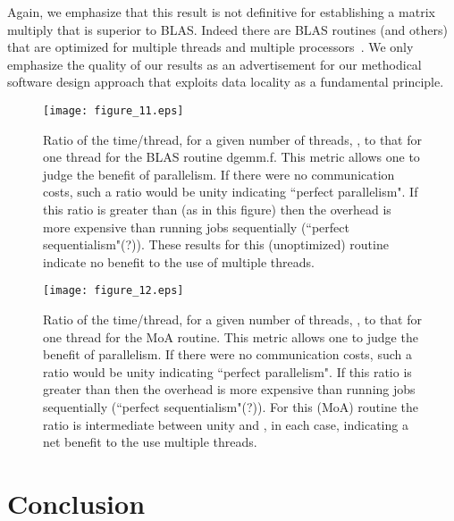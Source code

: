 \documentclass[aps,prl,twocolumn,groupedaddress,floatfix]{revtex4}
\begin{document}
Again, we emphasize that this result is not definitive for establishing
a matrix multiply that is superior to BLAS.  Indeed there are BLAS routines
(and others) that are optimized for multiple threads and multiple 
processors~\cite{addison,bentz05,santos03,bernsten89,chaterjee99,cherkassky88,
choi94,demmel93,fox87,lederman93a,li01,irony04,vandegeijn97}.  
We only
emphasize the quality of our results as an advertisement for our methodical
software design approach that exploits data locality as a fundamental 
principle.

\begin{figure} 
\texttt{[image: figure\_11.eps]}\caption{\label{fig10} Ratio of the time/thread, for a given number of 
threads, , to that for one thread for the BLAS routine dgemm.f.  This 
metric allows one to judge the benefit of parallelism.  If there were no 
communication costs, such a ratio would be unity indicating ``perfect 
parallelism".  If this ratio is greater than  (as in this figure) then
the overhead is more expensive than running  jobs sequentially 
(``perfect sequentialism"(?)).  These results for this (unoptimized) routine
indicate no benefit to the use of multiple threads.
}
\end{figure}

\begin{figure} 
\texttt{[image: figure\_12.eps]}\caption{\label{fig11} Ratio of the time/thread, for a given number of threads, 
, to that for one thread for the MoA routine.  This metric allows one to 
judge the benefit of parallelism.  If there were no communication costs, 
such a ratio would be unity indicating ``perfect parallelism".  If this ratio 
is greater than  then the overhead is more expensive than running  
jobs sequentially (``perfect sequentialism"(?)).  For this (MoA) routine
the ratio is intermediate between unity and , in each case, indicating a 
net benefit to the use multiple threads.
}
\end{figure}

\section{Conclusion}
\end{document}
